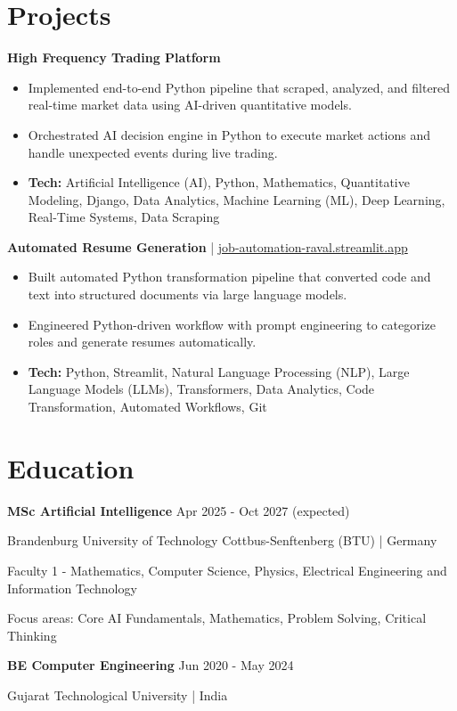 \documentclass[a4paper,10pt]{article}
\begin{document}
\section*{Projects}
\textbf{High Frequency Trading Platform}\par
\begin{itemize}
\item Implemented end-to-end Python pipeline that scraped, analyzed, and filtered real-time market data using AI-driven quantitative models.
\item Orchestrated AI decision engine in Python to execute market actions and handle unexpected events during live trading.
\item \textbf{Tech:} Artificial Intelligence (AI), Python, Mathematics, Quantitative Modeling, Django, Data Analytics, Machine Learning (ML), Deep Learning, Real-Time Systems, Data Scraping
\end{itemize}
\vspace{3pt}
\textbf{Automated Resume Generation} | \href{https://job-automation-raval.streamlit.app/}{job-automation-raval.streamlit.app}\par
\begin{itemize}
\item Built automated Python transformation pipeline that converted code and text into structured documents via large language models.
\item Engineered Python-driven workflow with prompt engineering to categorize roles and generate resumes automatically.
\item \textbf{Tech:} Python, Streamlit, Natural Language Processing (NLP), Large Language Models (LLMs), Transformers, Data Analytics, Code Transformation, Automated Workflows, Git
\end{itemize}
\vspace{3pt}

\section*{Education}
\textbf{MSc Artificial Intelligence} \hfill Apr 2025 - Oct 2027 (expected)\par
Brandenburg University of Technology Cottbus-Senftenberg (BTU) | Germany\par
Faculty 1 - Mathematics, Computer Science, Physics, Electrical Engineering and Information Technology\par
Focus areas: Core AI Fundamentals, Mathematics, Problem Solving, Critical Thinking\par
\vspace{3pt}
\textbf{BE Computer Engineering} \hfill Jun 2020 - May 2024\par
Gujarat Technological University | India\par
\vspace{3pt}
\end{document}
